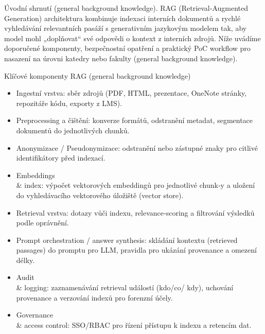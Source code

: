 
Úvodní shrnutí (general background knowledge).
RAG (Retrieval‑Augmented Generation) architektura kombinuje indexaci interních dokumentů a rychlé vyhledávání relevantních pasáží s generativním jazykovým modelem tak, aby model mohl „doplňovat“ své odpovědi o kontext z interních zdrojů. Níže uvádíme doporučené komponenty, bezpečnostní opatření a praktický PoC workflow pro nasazení na úrovni katedry nebo fakulty (general background knowledge).

Klíčové komponenty RAG (general background knowledge)
\begin{itemize}
  \item Ingestní vrstva: sběr zdrojů (PDF, HTML, prezentace, OneNote stránky, repozitáře kódu, exporty z LMS).
  \item Preprocessing a čištění: konverze formátů, odstranění metadat, segmentace dokumentů do jednotlivých chunků.
  \item Anonymizace / Pseudonymizace: odstranění nebo zástupné znaky pro citlivé identifikátory před indexací.
  \item Embeddings \\ \& index: výpočet vektorových embeddingů pro jednotlivé chunk‑y a uložení do vyhledávacího vektorového úložiště (vector store).
  \item Retrieval vrstva: dotazy vůči indexu, relevance‑scoring a filtrování výsledků podle oprávnění.
  \item Prompt orchestration / answer synthesis: skládání kontextu (retrieved passages) do promptu pro LLM, pravidla pro ukázání provenance a omezení délky.
  \item Audit \\ \& logging: zaznamenávání retrieval událostí (kdo/co/ kdy), uchování provenance a verzování indexů pro forenzní účely.
  \item Governance \\ \& access control: SSO/RBAC pro řízení přístupu k indexu a retencím dat.
\end{itemize}

